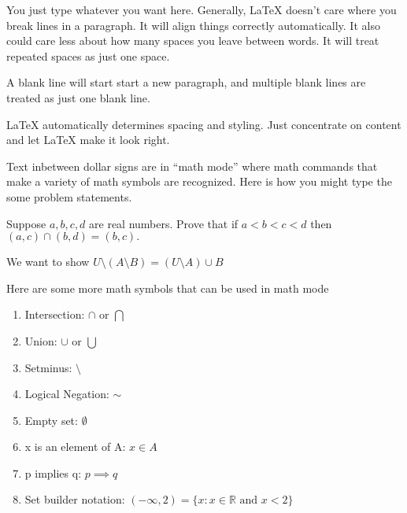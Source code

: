 \documentclass[12pt]{article}
\begin{document}





You just type whatever you want here. Generally, LaTeX doesn't care
where you break lines in a paragraph. It will align things correctly
automatically. It also could care less about how many spaces you leave
between words. It will treat repeated spaces as just one space.

A blank line will start start a new paragraph, and multiple blank
lines are treated as just one blank line.


LaTeX automatically determines spacing and styling. Just concentrate
on content and let LaTeX make it look right. 

Text inbetween dollar signs are in ``math mode'' where math commands that
make a variety of math symbols are recognized. Here is how you might type the
some problem statements.


 Suppose $a,b,c,d$ are real numbers.
Prove that if  $a< b < c < d$ then $(a,c) \cap (b,d) = (b,c).$


 We want to show 
$ U \setminus (A \setminus B) = ( U \setminus A ) \cup B$

\bigskip %

Here are some more math symbols that can be used in math mode

\begin{enumerate}  %
\item Intersection: $\cap$ or $\bigcap$
\item Union: $\cup$ or $\bigcup$
\item Setminus: $\setminus$
\item Logical Negation: $\sim $
\item Empty set: $\emptyset$
\item x is an element of A:    $x \in A$
\item p implies q: $p \implies q$
\item Set builder notation: $(-\infty,2) = \{x : x \in \mathbb{R}  \text{ and } x < 2 \}$
\end{enumerate} %
\end{document}
